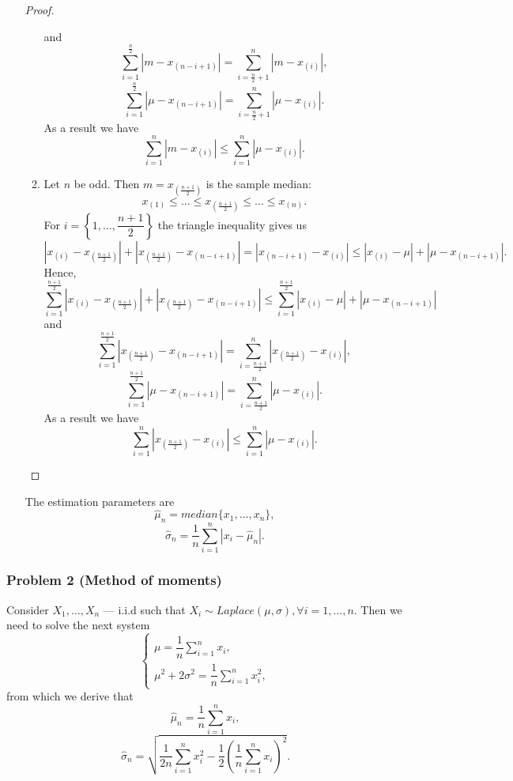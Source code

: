 \documentclass[a4paper, 12pt]{article}
\begin{document}
\begin{itemize}
\begin{proof}
\begin{enumerate}
$$$$
and
$$
\sum \limits_{i=1}^{\frac{n}{2}} |m - x_{(n - i + 1)}| = \sum \limits_{i=\frac{n}{2}+1}^n |m - x_{(i)}|,
$$
$$
\sum \limits_{i=1}^{\frac{n}{2}} |\mu - x_{(n - i + 1)}| = \sum \limits_{i=\frac{n}{2}+1}^n |\mu - x_{(i)}|. 
$$
As a result we have
$$
\sum \limits_{i=1}^n |m - x_{(i)}| \leqslant \sum \limits_{i=1}^n |\mu - x_{(i)}|.
$$
	\item  Let $n$ be odd. Then $m = x_{(\frac{n + 1}{2})}$ is the sample median:
$$
x_{(1)} \leqslant \ldots \leqslant x_{(\frac{n+1}{2})}  \leqslant \ldots \leqslant x_{(n)}.
$$
For $i = \left \{ 1, \ldots, \dfrac{n + 1}{2} \right\}$ the triangle inequality gives us
$$
|x_{(i)} - x_{(\frac{n + 1}{2})}| + |x_{(\frac{n + 1}{2})} - x_{(n - i + 1)}| = |x_{(n - i + 1)} - x_{(i)}|  \leqslant |x_{(i)} - \mu| + |\mu - x_{(n - i + 1)}|.
$$
Hence,
$$
\sum \limits_{i=1}^{\frac{n+1}{2}} |x_{(i)} - x_{(\frac{n + 1}{2})}| + |x_{(\frac{n + 1}{2})} - x_{(n - i + 1)}| \leqslant \sum \limits_{i=1}^{\frac{n+1}{2}} |x_{(i)} - \mu| + |\mu - x_{(n - i + 1)}|
$$
and
$$
\sum \limits_{i=1}^{\frac{n+1}{2}} |x_{(\frac{n + 1}{2})} - x_{(n - i + 1)}| = \sum \limits_{i=\frac{n+1}{2}}^n |x_{(\frac{n + 1}{2})}- x_{(i)}|,
$$
$$
\sum \limits_{i=1}^{\frac{n+1}{2}} |\mu - x_{(n - i + 1)}| = \sum \limits_{i=\frac{n+1}{2}}^n |\mu - x_{(i)}|. 
$$
As a result we have
$$
\sum \limits_{i=1}^n |x_{(\frac{n + 1}{2})} - x_{(i)}| \leqslant \sum \limits_{i=1}^n |\mu - x_{(i)}|.
$$	
\end{enumerate}
\end{proof}
The estimation parameters are  
$$
\hat{\mu}_n = median \{x_1, \ldots, x_n \}, 
$$
$$
\hat{\sigma}_n = \dfrac{1}{n} \sum \limits_{i=1}^n |x_i - \hat{\mu}_n|.
$$
\end{itemize}
\subsubsection{Problem 2 (Method of moments)}
Consider $X_1, \ldots, X_n$ --- i.i.d such that $X_i \sim Laplace(\mu, \sigma), \forall i = 1, \ldots, n.$ Then we need to solve the next system
$$
\begin{cases}
\mu = \dfrac{1}{n} \sum \limits_{i=1}^n x_i, \\
\mu^2 + 2 \sigma^2 = \dfrac{1}{n} \sum \limits_{i=1}^n x_i^2,
\end{cases}
$$
from which we derive that
$$
\hat{\mu}_n = \dfrac{1}{n} \sum \limits_{i=1}^n x_i, 
$$
$$
\hat{\sigma}_n = \sqrt{\dfrac{1}{2n} \sum \limits_{i=1}^n x_i^2 - \dfrac{1}{2} \left( \dfrac{1}{n} \sum \limits_{i=1}^n x_i \right)^2 }.
$$
\end{document}
